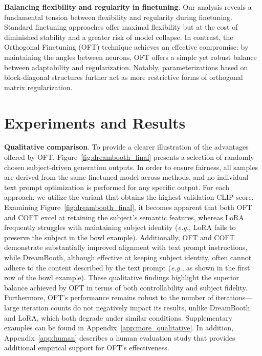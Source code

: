 \textbf{Balancing flexibility and regularity in finetuning}. Our analysis reveals a fundamental tension between flexibility and regularity during finetuning. Standard finetuning approaches offer maximal flexibility but at the cost of diminished stability and a greater risk of model collapse. In contrast, the Orthogonal Finetuning (OFT) technique achieves an effective compromise: by maintaining the angles between neurons, OFT offers a simple yet robust balance between adaptability and regularization. Notably, parameterizations based on block-diagonal structures further act as more restrictive forms of orthogonal matrix regularization.

\section{Experiments and Results}

\textbf{Qualitative comparison}. To provide a clearer illustration of the advantages offered by OFT, Figure~\ref{fig:dreambooth_final} presents a selection of randomly chosen subject-driven generation outputs. In order to ensure fairness, all samples are derived from the same finetuned model across methods, and no individual text prompt optimization is performed for any specific output. For each approach, we utilize the variant that obtains the highest validation CLIP score. Examining Figure~\ref{fig:dreambooth_final}, it becomes apparent that both OFT and COFT excel at retaining the subject's semantic features, whereas LoRA frequently struggles with maintaining subject identity (\emph{e.g.}, LoRA fails to preserve the subject in the bowl example). Additionally, OFT and COFT demonstrate substantially improved alignment with text prompt instructions, while DreamBooth, although effective at keeping subject identity, often cannot adhere to the content described by the text prompt (\emph{e.g.}, as shown in the first row of the bowl example). These qualitative findings highlight the superior balance achieved by OFT in terms of both controllability and subject fidelity. Furthermore, OFT's performance remains robust to the number of iterations—large iteration counts do not negatively impact its results, unlike DreamBooth and LoRA, which both degrade under similar conditions. Supplementary examples can be found in Appendix~\ref{app:more_qualitative}. In addition, Appendix~\ref{app:human} describes a human evaluation study that provides additional empirical support for OFT's effectiveness.


